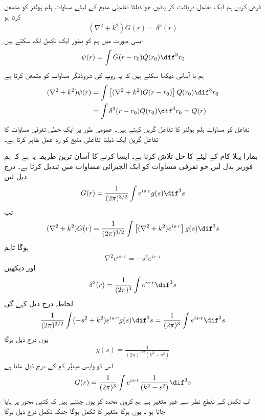 فرض کریں ہم ایک تفاعل  دریافت کر پائیں جو ڈیلٹا تفاعلی منبع کے لیئے مساوات ہلم ہولٹز کو متمعن کرتا ہو
\begin{align}
	(\nabla^2+k^2)G(r)=\delta^3(r)
\end{align}
ایسی صورت میں ہم  کو بطور ایک تکمل لکھ سکتے ہیں
\begin{align}
	\psi(r)=\int G(r-r_0)Q(r_0)\dif^3r_0
\end{align}
ہم با آسانی دیکھا سکتے ہیں کہ یہ  روپ کی شروڈنگر مساوات کو متمعن کرتا ہے
\begin{align*}
	(\nabla^2+k^2)\psi(r) &= \int\left[(\nabla^2+k^2)G(r-r_0)\right]Q(r_0)\dif^3r_0 \\
	&= \int\delta^3(r-r_0)Q(r_0)\dif^3r_0 = Q(r)
\end{align*}
تفاعل  کو مساوات ہلم ہولٹز کا تفاعل گرین کہتے ہیں۔ عمومی طور پر ایک خطی تفرقی مساوات کا تفاعل گرین ایک ڈیلٹا تفاعلی منبع کو ردِ عمل ظاہر کرتا ہے۔

ہمارا پہلا کام  کے لیئے  کا حل تلاش کرنا ہے۔ ایسا کرنے کا آسان ترین طریقہ یہ ہے کہ ہم فوریر بدل لیں جو تفرقی مساوات کو ایک الجبرائی مساوات میں تبدیل کرتا ہے۔ درج ذیل لیں
\begin{align}
	G(r)=\frac{1}{(2\pi)^{3/2}}\int e^{is\cdot r}g(s)\dif^3s
\end{align}
تب 
\begin{align*}
	(\nabla^2+k^2)G(r) = \frac{1}{(2\pi)^{3/2}}\int\left[(\nabla^2+k^2)e^{is\cdot r}\right]g(s)\dif^3s
\end{align*}
ہوگا تاہم
\begin{align}
	\nabla^2e^{is\cdot r} = -s^2 e^{is\cdot r}
\end{align}
اور  دیکھیں
\begin{align}
	\delta^3(r)=\frac{1}{(2\pi)^3}\int e^{is\cdot r}\dif^3s
\end{align}
لحاظہ  درج ذیل کہے گی
\begin{align*}
	\frac{1}{(2\pi)^{3/2}}\int(-s^2+k^2)e^{is\cdot r}g(s)\dif^3s = \frac{1}{(2\pi)^3}\int e^{is\cdot r}\dif^3s
\end{align*}
یوں درج ذیل ہوگا 
\begin{align}
	g(s) = \frac{1}{(2\pi)^{3/2}(k^2-s^2)}
\end{align}
اس کو واپس  میںپُر کع کے درج ذیل ملتا ہے
\begin{align}
	G(r) = \frac{1}{(2\pi)^3}\int e^{is\cdot r}\frac{1}{(k^2-s^2)}\dif^3s
\end{align}
اب  تکمل کے نقطع نظر سے  غیر متغیر ہے ہم کروی محدد  کو یوں چنتے ہیں کہ  کتبی محور پر پایا جاتا ہو ۔ یوں  ہوگا متغیر  کا تکمل  ہوگا جبکہ  تکمل درج ذیل ہوگا
 
